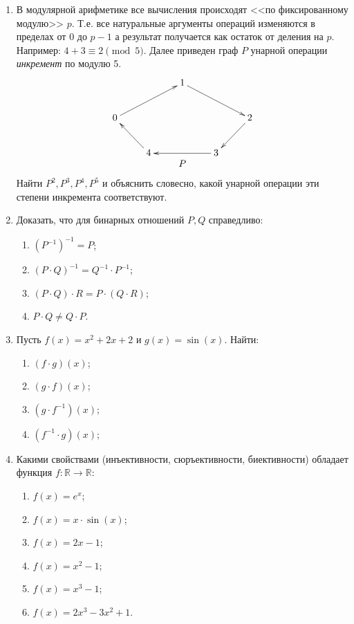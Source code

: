 \begin{enumerate}
    \item В модулярной арифметике все вычисления происходят <<по фиксированному модулю>> $p$. Т.е. все натуральные аргументы операций изменяются в пределах от $0$ до $p-1$ а результат получается как остаток от деления на $p$. Например: $4+3\equiv 2\pmod{5}$. Далее приведен граф $P$ унарной операции \emph{инкремент} по модулю 5.
    \[
        \begin{array}{c}
            {\xymatrix{
                *{}  
                    &*{} 
                        &1  \ar@{->}[drr]
                            &*{} 
                                &*{}  
                                    \\
                0  \ar@{->}[urr]
                    &*{}  
                        &*{}  
                            &*{}  
                                &2  \ar@{->}[dl]
                                    \\
                *{}  
                    &4  \ar@{->}[ul]
                        &*{}  
                            &3  \ar@{->}[ll]
                                &*{}  
            }}\\
            P
        \end{array}
    \]
    Найти $P^2,P^3,P^4,P^5$ и объяснить словесно, какой унарной операции эти степени инкремента соответствуют.
    
    \item Доказать, что для бинарных отношений $P,Q$ справедливо:
    \begin{enumerate}
        \item $(P^{-1})^{-1}=P$;
        \item $(P\cdot Q)^{-1}=Q^{-1}\cdot P^{-1}$;
        \item $(P\cdot Q)\cdot R=P\cdot(Q\cdot R)$;
        \item $P\cdot Q\neq Q\cdot P$.
    \end{enumerate}
    
    \item Пусть $f(x)=x^2+2x+2$ и $g(x)=\sin(x)$. Найти:
    \begin{enumerate}
        \item $(f\cdot g)(x)$;
        \item $(g\cdot f)(x)$;
        \item $(g\cdot f^{-1})(x)$;
        \item $(f^{-1}\cdot g)(x)$;
    \end{enumerate}
    
    \item Какими свойствами (инъективности, сюръективности, биективности) обладает функция $f:\mathbb{R}\to\mathbb{R}$:
    \begin{enumerate}
        \item $f(x)=e^x$;
        \item $f(x)=x\cdot \sin{(x)}$;
        \item $f(x)=2x-1$;
        \item $f(x)=x^2-1$;
        \item $f(x)=x^3-1$;
        \item $f(x)=2x^3-3x^2+1$.
    \end{enumerate}
    

\end{enumerate}
